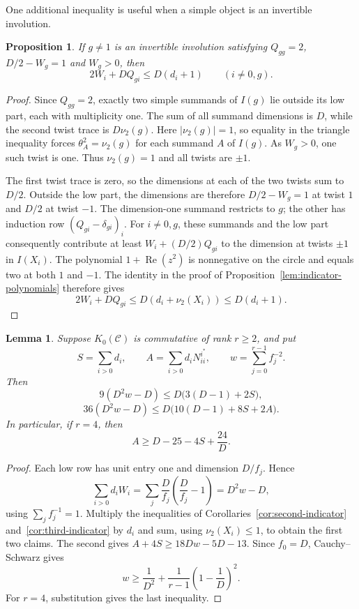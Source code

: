 \documentclass[11pt]{amsart}
\newtheorem{proposition}[theorem]{Proposition}
\newtheorem{lemma}[theorem]{Lemma}
\theoremstyle{definition}
\numberwithin{equation}{section}
\begin{document}
One additional inequality is useful when a simple object is an invertible
involution.
\begin{proposition}\label{prop:low-test}
If $g\ne1$ is an invertible involution satisfying
$Q_{gg}=2$, $D/2-W_g=1$ and $W_g>0$, then
\[
 2W_i+DQ_{gi}\leq D(d_i+1)\qquad(i\ne0,g).
\]
\end{proposition}
\begin{proof}
Since $Q_{gg}=2$, exactly two simple summands of $I(g)$ lie outside
its low part, each with multiplicity one. The sum of all summand
dimensions is $D$, while the second twist trace is $D\nu_2(g)$.
Here $|\nu_2(g)|=1$, so equality in the triangle inequality forces
$\theta_A^2=\nu_2(g)$ for each summand $A$ of $I(g)$.
As $W_g>0$, one such twist is one. Thus $\nu_2(g)=1$ and all twists
are $\pm1$.

The first twist trace is zero, so the dimensions at each of the two
twists sum to $D/2$. Outside the low part, the dimensions are therefore
$D/2-W_g=1$ at twist $1$ and $D/2$ at twist $-1$.
The dimension-one summand restricts to $g$; the other has induction row
$(Q_{gi}-\delta_{gi})_i$.
For $i\ne0,g$, these summands and the low part consequently contribute
at least $W_i+(D/2)Q_{gi}$ to the dimension at twists $\pm1$ in $I(X_i)$.
The polynomial $1+\operatorname{Re}(z^2)$ is nonnegative on the circle
and equals two at both $1$ and $-1$. The identity in the proof of
Proposition~\ref{lem:indicator-polynomials} therefore gives
\[
 2W_i+DQ_{gi}\leq D(d_i+\nu_2(X_i))\leq D(d_i+1).
\]
\end{proof}

\begin{samepage}
\begin{lemma}\label{lem:short-moments}
Suppose $K_0(\mathcal C)$ is commutative of rank $r\geq2$, and put
\[
 S=\sum_{i>0}d_i,\qquad A=\sum_{i>0}d_iN_{ii}^{i^*},\qquad
 w=\sum_{j=0}^{r-1}f_j^{-2}.
\]
Then
\begin{equation}\label{eq:short-second-moment}
 9(D^2w-D)\leq D\bigl(3(D-1)+2S\bigr),
\end{equation}
\[
 36(D^2w-D)\leq D\bigl(10(D-1)+8S+2A\bigr).
\]
In particular, if $r=4$, then
\begin{equation}\label{eq:short-diagonal-lower}
 A\geq D-25-4S+\frac{24}{D}.
\end{equation}
\end{lemma}
\end{samepage}
\begin{proof}
Each low row has unit entry one and dimension $D/f_j$. Hence
\[
 \sum_{i>0}d_iW_i
 =\sum_j\frac D{f_j}\left(\frac D{f_j}-1\right)=D^2w-D,
\]
using $\sum_jf_j^{-1}=1$. Multiply the inequalities of
Corollaries~\ref{cor:second-indicator} and~\ref{cor:third-indicator}
by $d_i$ and sum, using $\nu_2(X_i)\leq1$, to obtain the first two claims.
The second gives $A+4S\geq18Dw-5D-13$.
Since $f_0=D$, Cauchy--Schwarz gives
\[
 w\geq\frac1{D^2}+\frac1{r-1}\left(1-\frac1D\right)^2.
\]
For $r=4$, substitution gives the last inequality.
\end{proof}
\end{document}
